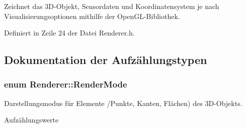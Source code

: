 Zeichnet das 3\-D-\/\-Objekt, Sensordaten und Koordinatensystem je nach Visualisierungsoptionen mithilfe der Open\-G\-L-\/\-Bibliothek. 

Definiert in Zeile 24 der Datei Renderer.\-h.



\subsection{Dokumentation der Aufzählungstypen}
\hypertarget{classRenderer_aa9844470f59e9fdf3aed088936100863}{
\subsubsection[{Render\-Mode}]{\setlength{\rightskip}{0pt plus 5cm}enum {\bf Renderer\-::\-Render\-Mode}}}\label{classRenderer_aa9844470f59e9fdf3aed088936100863}


Darstellungsmodus für Elemente /\-Punkte, Kanten, Flächen) des 3\-D-\/\-Objekts. 

\begin{Desc}
\item[Aufzählungswerte]\par
\begin{description}
\item[{\em 
\hypertarget{classRenderer_aa9844470f59e9fdf3aed088936100863a117f4ca0fdddef6e71774540e331efe9}{R\-M\-\_\-\-N\-O\-N\-E}\label{classRenderer_aa9844470f59e9fdf3aed088936100863a117f4ca0fdddef6e71774540e331efe9}
}]\item[{\em 
\hypertarget{classRenderer_aa9844470f59e9fdf3aed088936100863a5b763e13120b7189e59806712789556b}{R\-M\-\_\-\-M\-A\-T\-E\-R\-I\-A\-L\-C\-O\-L\-O\-R}\label{classRenderer_aa9844470f59e9fdf3aed088936100863a5b763e13120b7189e59806712789556b}
}]\item[{\em 
\hypertarget{classRenderer_aa9844470f59e9fdf3aed088936100863aff17440f3de9508b77d4762742c00c07}{R\-M\-\_\-\-V\-A\-L\-U\-E\-C\-O\-L\-O\-R}\label{classRenderer_aa9844470f59e9fdf3aed088936100863aff17440f3de9508b77d4762742c00c07}
}]\end{description}
\end{Desc}


